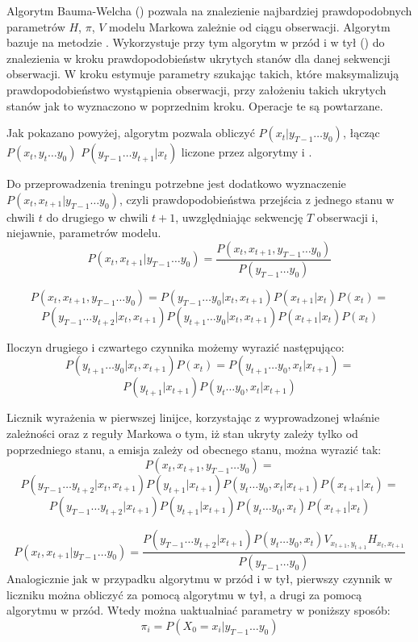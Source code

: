Algorytm Bauma-Welcha () pozwala na znalezienie najbardziej prawdopodobnych parametrów
$H$, $\pi$, $V$ modelu Markowa zależnie od ciągu obserwacji. Algorytm bazuje na metodzie
. Wykorzystuje przy tym algorytm w przód i w tył ()
do znalezienia w kroku  prawdopodobieństw ukrytych stanów dla danej sekwencji obserwacji.
W kroku  estymuje parametry szukając takich, które maksymalizują prawdopodobieństwo wystąpienia
obserwacji, przy założeniu takich ukrytych stanów jak to wyznaczono w poprzednim kroku. Operacje te są powtarzane.

Jak pokazano powyżej, algorytm  pozwala obliczyć $P(x_t | y_{T-1} \dots y_0)$,
łącząc $P(x_t, y_t \dots y_0)$ $P(y_{T-1} \dots y_{t+1} | x_t)$ liczone przez algorytmy  i .

Do przeprowadzenia treningu  potrzebne jest dodatkowo wyznaczenie $P(x_t, x_{t+1} | y_{T-1} \dots y_0)$,
czyli prawdopodobieństwa przejścia z jednego stanu w chwili $t$ do drugiego w chwili $t + 1$,
uwzględniając sekwencję $T$ obserwacji i, niejawnie, parametrów modelu.
$$P(x_t, x_{t+1} | y_{T-1} \dots y_0)
= \frac{P(x_t, x_{t+1}, y_{T-1} \dots y_0)}{P(y_{T-1} \dots y_0)}$$

$$P(x_t, x_{t+1}, y_{T-1} \dots y_0) = P(y_{T-1} \dots y_0 | x_t, x_{t+1}) P(x_{t+1} | x_t) P(x_t) = $$
$$P(y_{T-1} \dots y_{t+2} | x_t, x_{t+1}) P(y_{t+1} \dots y_0 | x_t, x_{t+1}) P(x_{t+1} | x_t) P(x_t)$$

Iloczyn drugiego i czwartego czynnika możemy wyrazić następująco:
$$P(y_{t+1} \dots y_0 | x_t, x_{t+1}) P(x_t) = P(y_{t+1} \dots y_0, x_t | x_{t+1}) = $$
$$P(y_{t+1} | x_{t+1}) P(y_t \dots y_0, x_t | x_{t+1})$$

Licznik wyrażenia w pierwszej linijce, korzystając z wyprowadzonej właśnie zależności oraz z reguły Markowa o tym,
iż stan ukryty zależy tylko od poprzedniego stanu, a emisja zależy od obecnego stanu, można wyrazić tak:
$$P(x_t, x_{t+1}, y_{T-1} \dots y_0) =$$
$$P(y_{T-1} \dots y_{t+2} | x_t, x_{t+1}) P(y_{t+1} | x_{t+1}) P(y_t \dots y_0, x_t | x_{t+1}) P(x_{t+1} | x_t) =$$
$$P(y_{T-1} \dots y_{t+2} | x_{t+1}) P(y_{t+1} | x_{t+1}) P(y_t \dots y_0, x_t) P(x_{t+1} | x_t)$$

$$P(x_t, x_{t+1} | y_{T-1} \dots y_0)
= \frac{P(y_{T-1} \dots y_{t+2} | x_{t+1}) P(y_t \dots y_0, x_t) V_{x_{t+1}, y_{t+1}} H_{x_t, x_{t+1}}}{P(y_{T-1} \dots y_0)}$$
Analogicznie jak w przypadku algorytmu w przód i w tył, pierwszy czynnik w liczniku można obliczyć za pomocą
algorytmu w tył, a drugi za pomocą algorytmu w przód. Wtedy można uaktualniać parametry w poniższy sposób: 
$$\pi_i = P(X_0 = x_i | y_{T-1} \dots y_0)$$

